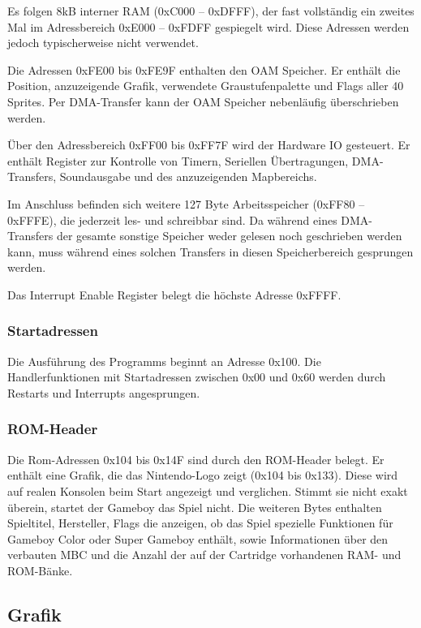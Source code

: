 \documentclass[a4paper]{scrartcl}
\begin{document}
Es folgen 8kB interner RAM (0xC000 -- 0xDFFF), der fast vollständig ein zweites Mal im Adressbereich 0xE000 -- 0xFDFF gespiegelt wird. Diese Adressen werden jedoch typischerweise nicht verwendet.

Die Adressen 0xFE00 bis 0xFE9F enthalten den OAM Speicher. Er enthält die Position, anzuzeigende Grafik, verwendete Graustufenpalette und Flags aller 40 Sprites. Per DMA-Transfer kann der OAM Speicher nebenläufig überschrieben werden.

Über den Adressbereich 0xFF00 bis 0xFF7F wird der Hardware IO gesteuert. Er enthält Register zur Kontrolle von Timern, Seriellen Übertragungen, DMA-Transfers, Soundausgabe und des anzuzeigenden Mapbereichs.

Im Anschluss befinden sich weitere 127 Byte Arbeitsspeicher (0xFF80 -- 0xFFFE), die jederzeit les- und schreibbar sind. Da während eines DMA-Transfers der gesamte sonstige Speicher weder gelesen noch geschrieben werden kann, muss während eines solchen Transfers in diesen Speicherbereich gesprungen werden.

Das Interrupt Enable Register belegt die höchste Adresse 0xFFFF.

\subsubsection{Startadressen}

Die Ausführung des Programms beginnt an Adresse 0x100. Die Handlerfunktionen mit Startadressen zwischen 0x00 und 0x60 werden durch Restarts und Interrupts angesprungen. 

\subsubsection{ROM-Header}

Die Rom-Adressen 0x104 bis 0x14F sind durch den ROM-Header belegt. Er enthält eine Grafik, die das Nintendo-Logo zeigt (0x104 bis 0x133). Diese wird auf realen Konsolen beim Start angezeigt und verglichen. Stimmt sie nicht exakt überein, startet der Gameboy das Spiel nicht. Die weiteren Bytes enthalten Spieltitel, Hersteller, Flags die anzeigen, ob das Spiel spezielle Funktionen für Gameboy Color oder Super Gameboy enthält, sowie Informationen über den verbauten MBC und die Anzahl der auf der Cartridge vorhandenen RAM- und ROM-Bänke.
\subsection{Grafik}
\end{document}
